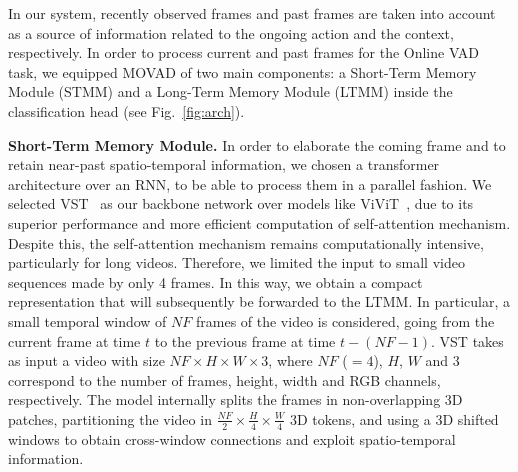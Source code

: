 In our system, recently observed frames and past frames are taken into account as a source of information related to the ongoing action and the context, respectively.
In order to process current and past frames for the Online VAD task, we equipped MOVAD of two main components: a Short-Term Memory Module (STMM) and a Long-Term Memory Module (LTMM) inside the classification head (see Fig.~\ref{fig:arch}). 

\noindent\textbf{Short-Term Memory Module.}
In order to elaborate the coming frame and to retain near-past spatio-temporal information, we chosen a transformer architecture over an RNN, to be able to process them in a parallel fashion. 
We selected VST~\cite{liu_video_2022} as our backbone network over models like ViViT~\cite{Arnab_2021_ICCV}, due to its superior performance and more efficient computation of self-attention mechanism.
Despite this, the self-attention mechanism remains computationally intensive, particularly for long videos. 
Therefore, we limited the input to small video sequences made by only 4 frames.
In this way, we obtain a compact representation that will subsequently be forwarded to the LTMM.
In particular, a small temporal window of $\mathit{NF}$ frames of the video is considered, going from the current frame at time $t$ to the previous frame at time $t-\left(\mathit{NF}-1\right)$.
VST takes as input a video with size $\mathit{NF} \times H \times W \times 3$, where $\mathit{NF}$ ($=4$), $H$, $W$ and $3$ correspond to the number of frames, height, width and RGB channels, respectively.
The model internally splits the frames in non-overlapping 3D patches, partitioning the video in $\frac{\mathit{NF}}{2} \times \frac{H}{4} \times \frac{W}{4}$ 3D tokens, and using a 3D shifted windows to obtain cross-window connections and exploit spatio-temporal information.

